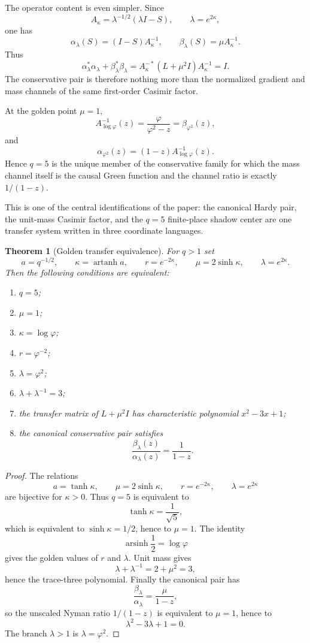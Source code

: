 \documentclass[11pt]{article}
\newtheorem{theorem}{Theorem}[section]
\theoremstyle{definition}
\theoremstyle{remark}
\DeclareMathOperator{\artanh}{artanh}
\DeclareMathOperator{\arsinh}{arsinh}
\begin{document}
The operator content is even simpler.  Since
\[
A_\kappa
=
\lambda^{-1/2}(\lambda I-S),
\qquad
\lambda=e^{2\kappa},
\]
one has
\[
\boxed{
\alpha_\lambda(S)=(I-S)A_\kappa^{-1},
\qquad
\beta_\lambda(S)=\mu A_\kappa^{-1}.
}
\]
Thus
\[
\alpha_\lambda^*\alpha_\lambda
+
\beta_\lambda^*\beta_\lambda
=
A_\kappa^{-*}(L+\mu^2I)A_\kappa^{-1}
=I.
\]
The conservative pair is therefore nothing more than the normalized gradient and mass channels of the same first-order Casimir factor.

At the golden point \(\mu=1\),
\[
A_{\log\varphi}^{-1}(z)
=
\frac{\varphi}{\varphi^2-z}
=
\beta_{\varphi^2}(z),
\]
and
\[
\alpha_{\varphi^2}(z)
=
(1-z)A_{\log\varphi}^{-1}(z).
\]
Hence \(q=5\) is the unique member of the conservative family for which the mass channel itself is the causal Green function and the channel ratio is exactly \(1/(1-z)\).

This is one of the central identifications of the paper: the canonical Hardy pair, the unit-mass Casimir factor, and the \(q=5\) finite-place shadow center are one transfer system written in three coordinate languages.


\begin{theorem}[Golden transfer equivalence]
For \(q>1\) set
\[
a=q^{-1/2},\qquad
\kappa=\artanh a,\qquad
r=e^{-2\kappa},\qquad
\mu=2\sinh\kappa,\qquad
\lambda=e^{2\kappa}.
\]
Then the following conditions are equivalent:
\begin{enumerate}[label=(\roman*)]
\item \(q=5\);
\item \(\mu=1\);
\item \(\kappa=\log\varphi\);
\item \(r=\varphi^{-2}\);
\item \(\lambda=\varphi^2\);
\item \(\lambda+\lambda^{-1}=3\);
\item the transfer matrix of \(L+\mu^2I\) has characteristic polynomial \(x^2-3x+1\);
\item the canonical conservative pair satisfies
\[
\frac{\beta_\lambda(z)}{\alpha_\lambda(z)}
=
\frac1{1-z}.
\]
\end{enumerate}
\end{theorem}

\begin{proof}
The relations
\[
a=\tanh\kappa,\qquad
\mu=2\sinh\kappa,\qquad
r=e^{-2\kappa},\qquad
\lambda=e^{2\kappa}
\]
are bijective for \(\kappa>0\).  Thus \(q=5\) is equivalent to
\[
\tanh\kappa=\frac1{\sqrt5},
\]
which is equivalent to \(\sinh\kappa=1/2\), hence to \(\mu=1\).  The identity
\[
\arsinh\frac12=\log\varphi
\]
gives the golden values of \(r\) and \(\lambda\).  Unit mass gives
\[
\lambda+\lambda^{-1}=2+\mu^2=3,
\]
hence the trace-three polynomial.  Finally the canonical pair has
\[
\frac{\beta_\lambda}{\alpha_\lambda}
=
\frac{\mu}{1-z},
\]
so the unscaled Nyman ratio \(1/(1-z)\) is equivalent to \(\mu=1\), hence to
\[
\lambda^2-3\lambda+1=0.
\]
The branch \(\lambda>1\) is \(\lambda=\varphi^2\).
\end{proof}
\end{document}
